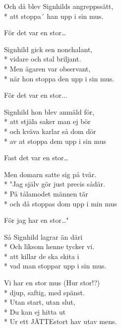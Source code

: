 \begin{SongText}
\begin{SongVerse}
        Och då blev Signhilds angreppssätt,\\*%
        att stoppa´ han upp i sin mus.
    \end{SongVerse}
    \begin{SongVerse}
        För det var en stor…
    \end{SongVerse}
    \begin{SongVerse}
        Signhild gick sen nonchalant,\\*%
        vidare och stal briljant.\\*%
        Men ägaren var observant,\\*%
        när hon stoppa den upp i sin mus.
    \end{SongVerse}
    \begin{SongVerse}
        För det var en stor...
    \end{SongVerse}
    \begin{SongVerse}
        Signhild hon blev anmäld för,\\*%
        att stjäla saker man ej bör\\*%
        och kväva karlar så dom dör\\*%
        av at stoppa dem upp i sin mus
    \end{SongVerse}
    \begin{SongVerse}
        Fast det var en stor…
    \end{SongVerse}
    \begin{SongVerse}
        Men domarn satte sig på tvär.\\*%
        "Jag själv gör just precis sådär.\\*%
        På tålamodet männen tär\\*%
        och då stoppas dom upp i min mus
    \end{SongVerse}
    \begin{SongVerse}
        För jag har en stor…"
    \end{SongVerse}
    \begin{SongVerse}
        Så Signhild lagrar än däri\\*%
        Och liksom henne tycker vi.\\*%
        att killar de ska skita i\\*%
        vad man stoppar upp i sin mus.
    \end{SongVerse}
    \begin{SongVerse}
        Vi har en stor mus (Hur stor!?)\\*%
        djup, saftig, med spänst.\\*%
        Utan start, utan slut,\\*%
        Du kan ej hitta ut\\*%
        Ur ett JÄTTEstort hav utav mens.
    \end{SongVerse}
\end{SongText}
